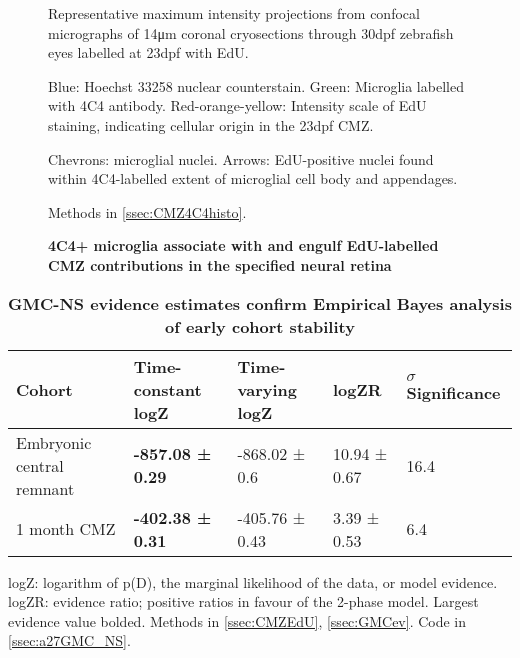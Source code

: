 \begin{figure}[!h]
    \caption{{\bf 4C4+ microglia associate with and engulf EdU-labelled CMZ contributions in the specified neural retina}}
    Representative maximum intensity projections from confocal micrographs of 14\si{\micro\metre} coronal cryosections through 30dpf zebrafish eyes labelled at 23dpf with EdU.
    
    Blue: Hoechst 33258 nuclear counterstain. Green: Microglia labelled with 4C4 antibody. Red-orange-yellow: Intensity scale of EdU staining, indicating cellular origin in the 23dpf CMZ.

    Chevrons: microglial nuclei. Arrows: EdU-positive nuclei found within 4C4-labelled extent of microglial cell body and appendages.
    
    Methods in \autoref{ssec:CMZ4C4histo}.
    \label{CMZ4C4micrograph}
\end{figure}

\begin{table}[!ht]
    \centering
    \caption{{\bf GMC-NS evidence estimates confirm Empirical Bayes analysis of early cohort stability}}
    \begin{tabular}{|l|l|l|l|l|} \hline 
        {\bf Cohort} & {\bf Time-constant logZ} & {\bf Time-varying logZ} & {\bf logZR} & {\bf $\sigma$ Significance}\\ \hline
        Embryonic central remnant & {\bf -857.08 ± 0.29} & -868.02 ± 0.6 & 10.94 ± 0.67 & 16.4\\ \hline
        1 month CMZ & {\bf -402.38 ± 0.31} & -405.76 ± 0.43 & 3.39 ± 0.53 & 6.4\\ \hline
    \end{tabular}
    \begin{flushleft} logZ: logarithm of p(D), the marginal likelihood of the data, or model evidence. logZR: evidence ratio; positive ratios in favour of the 2-phase model. Largest evidence value bolded.
    Methods in \autoref{ssec:CMZEdU}, \autoref{ssec:GMCev}.
    Code in \autoref{ssec:a27GMC_NS}.
    \end{flushleft}
    \label{turnoverGMCtable}
\end{table}

